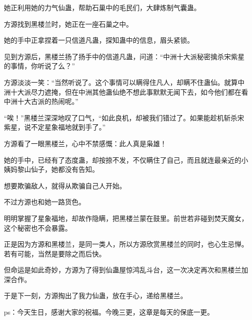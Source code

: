 \begin{this_body}
她正利用她的力气仙蛊，帮助石巢中的毛民们，大肆炼制气囊蛊。

方源找到黑楼兰时，她正在一座石巢之中。

她的手中正拿捏着一只信道凡蛊，探知蛊中的信息，眉头紧锁。

见到方源后，黑楼兰扬了扬手中的信道凡蛊，问道：“中洲十大派秘密擒杀宋紫星的事情，你听说了么？”

方源淡淡一笑：“当然听说了。这个事情可以瞒得住凡人，却瞒不住蛊仙。就算中洲十大派尽力遮掩，但在中洲其他蛊仙绝不想此事默默无闻下去，如今他们都在看中洲十大古派的热闹呢。”

“唉！”黑楼兰深深地叹了口气，“如此良机，却被我们错过了。如果能趁机斩杀宋紫星，说不定星象福地就到手了。”

方源看了一眼黑楼兰，心中不禁感慨：此人真是枭雄！

她的手中，已经有了态度蛊，却按捺不发，不仅瞒住了自己，而且就连最亲近的小姨妈黎山仙子，她都没有告知。

想要欺骗敌人，就得从欺骗自己人开始。

不过方源也和她一路货色。

明明掌握了星象福地，却故作隐瞒，把黑楼兰蒙在鼓里。前世若非碰到焚天魔女，这个秘密也不会暴露。

正是因为方源和黑楼兰，是同一类人，所以方源欣赏黑楼兰的同时，也心生忌惮。若有可能，当然是要除之而后快。

但命运是如此奇妙，方源为了得到仙蛊屋惊鸿乱斗台，这一次决定再次和黑楼兰加深合作。

于是下一刻，方源掏出了我力仙蛊，放在手心，递给黑楼兰。

ps：今天生日，感谢大家的祝福。今晚三更，这章是每天的保底一更。

\end{this_body}

